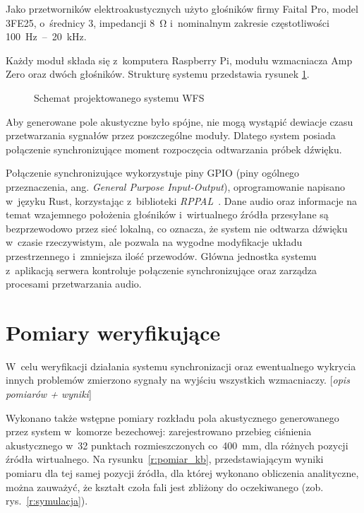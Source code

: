\documentclass[10pt, a4paper]{article}
\let\Oldsection\section
\renewcommand{\section}{\FloatBarrier\Oldsection}
\begin{document}
Jako przetworników elektroakustycznych użyto głośników firmy Faital Pro, model 3FE25,
o~średnicy \SI{3}{\inch}, impedancji \SI{8}{\ohm} i~nominalnym zakresie 
częstotliwości \SI{100}{\hertz}~--~\SI{20}{\kilo\hertz}.

Każdy moduł składa się z~komputera Raspberry Pi, modułu wzmacniacza Amp Zero
oraz dwóch głośników. 
Strukturę systemu przedstawia rysunek \ref{fig:schemat}.

\begin{figure}[!tbh]
  \centering
  \caption{Schemat projektowanego systemu WFS}
  \label{fig:schemat}
\end{figure}

Aby generowane pole akustyczne było spójne, nie mogą wystąpić dewiacje czasu
przetwarzania sygnałów przez poszczególne moduły. Dlatego system posiada połączenie
synchronizujące moment rozpoczęcia odtwarzania próbek dźwięku.

Połączenie synchronizujące wykorzystuje piny GPIO (piny ogólnego przeznaczenia, ang.
\textit{General Purpose Input-Output}), oprogramowanie napisano w~języku 
Rust, korzystając z~biblioteki 
\emph{RPPAL}~\cite{RPPAL}. Dane audio oraz informacje na temat wzajemnego położenia 
głośników i~wirtualnego źródła przesyłane są bezprzewodowo przez sieć lokalną, co
oznacza, że system nie odtwarza dźwięku w~czasie rzeczywistym, ale
pozwala na wygodne modyfikacje układu przestrzennego i~zmniejsza ilość
przewodów. Główna jednostka systemu z~aplikacją serwera kontroluje połączenie
synchronizujące oraz zarządza procesami przetwarzania audio.

\section{Pomiary weryfikujące}

W~celu weryfikacji działania systemu synchronizacji oraz ewentualnego wykrycia innych 
problemów zmierzono sygnały na wyjściu wszystkich wzmacniaczy. [\textit{opis pomiarów + wyniki}]

Wykonano także wstępne pomiary rozkładu pola akustycznego generowanego przez system 
w~komorze bezechowej: zarejestrowano przebieg ciśnienia akustycznego w~32 punktach 
rozmieszczonych co~\SI{400}{\milli\metre}, dla różnych pozycji źródła wirtualnego. 
Na rysunku~\ref{r:pomiar_kb}, przedstawiającym wyniki pomiaru dla tej samej pozycji 
źródła, dla której wykonano obliczenia analityczne, można zauważyć,
że kształt czoła fali jest zbliżony do oczekiwanego (zob. rys.~\ref{r:symulacja}).
\end{document}
